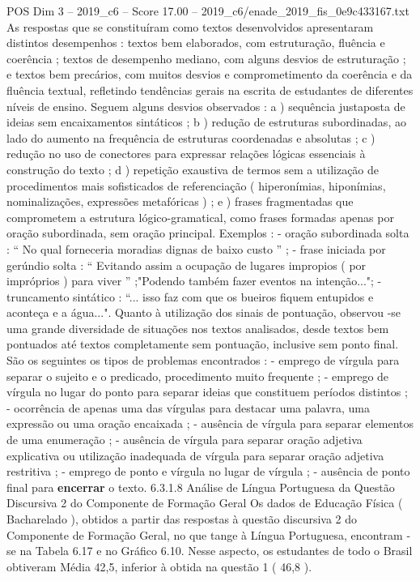\begin{textsample}{POS Dim 3 – 2019\_c6 – Score 17.00 – 2019\_c6/enade\_2019\_fis\_0e9c433167.txt}
As respostas que se constituíram como textos desenvolvidos apresentaram distintos desempenhos : textos bem elaborados, com estruturação, fluência e coerência ; textos de desempenho mediano, com alguns desvios de estruturação ; e textos bem precários, com muitos desvios e comprometimento da coerência e da fluência textual, refletindo tendências gerais na escrita de estudantes de diferentes níveis de ensino.
Seguem alguns desvios observados : a ) sequência justaposta de ideias sem encaixamentos sintáticos ; b ) redução de estruturas subordinadas, ao lado do aumento na frequência de estruturas coordenadas e absolutas ; c ) redução no uso de conectores para expressar relações lógicas essenciais à construção do texto ; d ) repetição exaustiva de termos sem a utilização de procedimentos mais sofisticados de referenciação ( hiperonímias, hiponímias, nominalizações, expressões metafóricas ) ; e ) frases fragmentadas que comprometem a estrutura lógico-gramatical, como frases formadas apenas por oração subordinada, sem oração principal.
Exemplos : - oração subordinada solta : “ No qual forneceria moradias dignas de baixo custo ” ; - frase iniciada por gerúndio solta : “ Evitando assim a ocupação de lugares impropios ( por impróprios ) para viver ” ;"Podendo também fazer eventos na intenção..."; - truncamento sintático : “... isso faz com que os bueiros fiquem entupidos e aconteça e a água...".
Quanto à utilização dos sinais de pontuação, observou -se uma grande diversidade de situações nos textos analisados, desde textos bem pontuados até textos completamente sem pontuação, inclusive sem ponto final.
São os seguintes os tipos de problemas encontrados : - emprego de vírgula para separar o sujeito e o predicado, procedimento muito frequente ; - emprego de vírgula no lugar do ponto para separar ideias que constituem períodos distintos ; - ocorrência de apenas uma das vírgulas para destacar uma palavra, uma expressão ou uma oração encaixada ; - ausência de vírgula para separar elementos de uma enumeração ; - ausência de vírgula para separar oração adjetiva explicativa ou utilização inadequada de vírgula para separar oração adjetiva restritiva ; - emprego de ponto e vírgula no lugar de vírgula ; - ausência de ponto final para \textbf{encerrar} o texto. 6.3.1.8 Análise de Língua Portuguesa da Questão Discursiva 2 do Componente de Formação Geral Os dados de Educação Física ( Bacharelado ), obtidos a partir das respostas à questão discursiva 2 do Componente de Formação Geral, no que tange à Língua Portuguesa, encontram -se na Tabela 6.17 e no Gráfico 6.10.
Nesse aspecto, os estudantes de todo o Brasil obtiveram Média 42,5, inferior à obtida na questão 1 ( 46,8 ).

\end{textsample}
